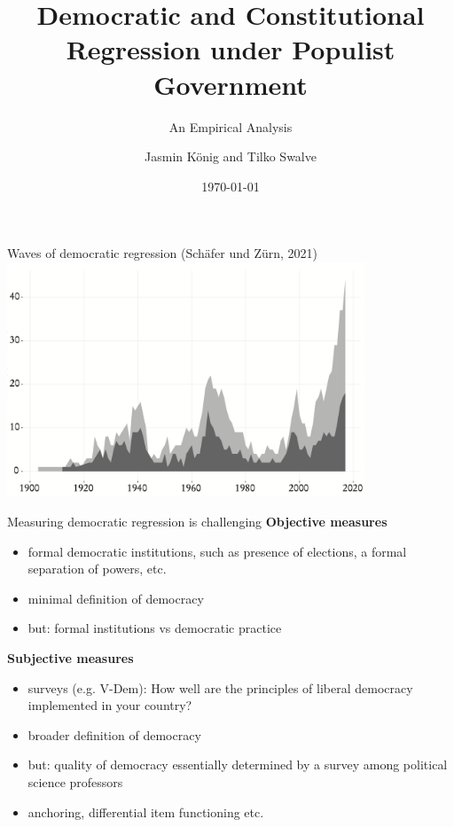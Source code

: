 \documentclass[xcolor=dvipsnames,aspectratio=169,12pt]{beamer}
\title{Democratic and Constitutional Regression under Populist Government}
\subtitle{An Empirical Analysis}
\author{Jasmin König and Tilko Swalve}
\date{\today}
\begin{document}
\maketitle





\begin{frame}{Waves of democratic regression (Schäfer und Zürn, 2021)}
    \centering
\includegraphics[width=0.8\textwidth]{fig/democraticregression}
\end{frame}



\begin{frame}{Measuring democratic regression is challenging}
    \textbf{Objective measures}
\begin{itemize}
    \item formal democratic institutions, such as presence of elections, a formal separation of powers, etc.
    \item minimal definition of democracy
    \item but: formal institutions vs democratic practice
\end{itemize}
\textbf{Subjective measures}
\begin{itemize}
    \item surveys (e.g. V-Dem): How well are the principles of liberal democracy implemented in your country?
    \item broader definition of democracy
    \item but: quality of democracy essentially determined by a survey among political science professors
    \item anchoring, differential item functioning etc.
\end{itemize}  
\end{frame}
\end{document}
